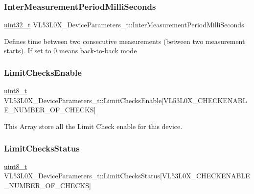\subsubsection{\texorpdfstring{Inter\+Measurement\+Period\+Milli\+Seconds}{InterMeasurementPeriodMilliSeconds}}
{\footnotesize\ttfamily \hyperlink{vl53l0x__types_8h_a435d1572bf3f880d55459d9805097f62}{uint32\+\_\+t} V\+L53\+L0\+X\+\_\+\+Device\+Parameters\+\_\+t\+::\+Inter\+Measurement\+Period\+Milli\+Seconds}

Defines time between two consecutive measurements (between two measurement starts). If set to 0 means back-\/to-\/back mode \mbox{\label{structVL53L0X__DeviceParameters__t_a2e98f29647c0d6eef03ab816fb563334}} 
\subsubsection{\texorpdfstring{Limit\+Checks\+Enable}{LimitChecksEnable}}
{\footnotesize\ttfamily \hyperlink{vl53l0x__types_8h_aba7bc1797add20fe3efdf37ced1182c5}{uint8\+\_\+t} V\+L53\+L0\+X\+\_\+\+Device\+Parameters\+\_\+t\+::\+Limit\+Checks\+Enable\mbox{[}V\+L53\+L0\+X\+\_\+\+C\+H\+E\+C\+K\+E\+N\+A\+B\+L\+E\+\_\+\+N\+U\+M\+B\+E\+R\+\_\+\+O\+F\+\_\+\+C\+H\+E\+C\+KS\mbox{]}}

This Array store all the Limit Check enable for this device. \mbox{\label{structVL53L0X__DeviceParameters__t_adc836ef0c21accb4957b11cdd662483b}} 
\subsubsection{\texorpdfstring{Limit\+Checks\+Status}{LimitChecksStatus}}
{\footnotesize\ttfamily \hyperlink{vl53l0x__types_8h_aba7bc1797add20fe3efdf37ced1182c5}{uint8\+\_\+t} V\+L53\+L0\+X\+\_\+\+Device\+Parameters\+\_\+t\+::\+Limit\+Checks\+Status\mbox{[}V\+L53\+L0\+X\+\_\+\+C\+H\+E\+C\+K\+E\+N\+A\+B\+L\+E\+\_\+\+N\+U\+M\+B\+E\+R\+\_\+\+O\+F\+\_\+\+C\+H\+E\+C\+KS\mbox{]}}

